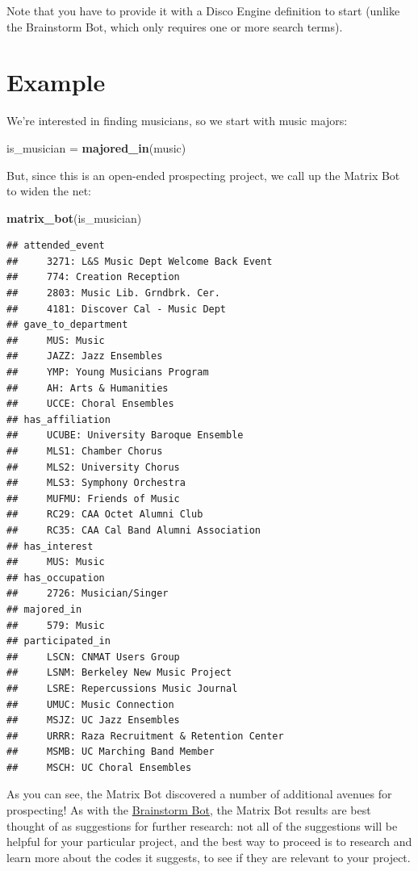 \documentclass[]{book}
\newenvironment{Shaded}{\begin{snugshade}}{\end{snugshade}}
\newcommand{\KeywordTok}[1]{\textcolor[rgb]{0.13,0.29,0.53}{\textbf{#1}}}
\newcommand{\NormalTok}[1]{#1}
\newcommand{\StringTok}[1]{\textcolor[rgb]{0.31,0.60,0.02}{#1}}
\begin{document}
Note that you have to provide it with a Disco Engine definition to start (unlike the Brainstorm Bot, which only requires one or more search terms).

\hypertarget{example-1}{%
\section{Example}\label{example-1}}

We're interested in finding musicians, so we start with music majors:

\begin{Shaded}
\begin{Highlighting}[]
\NormalTok{is_musician =}\StringTok{ }\KeywordTok{majored_in}\NormalTok{(music)}
\end{Highlighting}
\end{Shaded}

But, since this is an open-ended prospecting project, we call up the Matrix Bot to widen the net:

\begin{Shaded}
\begin{Highlighting}[]
\KeywordTok{matrix_bot}\NormalTok{(is_musician)}
\end{Highlighting}
\end{Shaded}

\begin{verbatim}
## attended_event 
##     3271: L&S Music Dept Welcome Back Event
##     774: Creation Reception
##     2803: Music Lib. Grndbrk. Cer.
##     4181: Discover Cal - Music Dept
## gave_to_department 
##     MUS: Music
##     JAZZ: Jazz Ensembles
##     YMP: Young Musicians Program
##     AH: Arts & Humanities
##     UCCE: Choral Ensembles
## has_affiliation 
##     UCUBE: University Baroque Ensemble
##     MLS1: Chamber Chorus
##     MLS2: University Chorus
##     MLS3: Symphony Orchestra
##     MUFMU: Friends of Music
##     RC29: CAA Octet Alumni Club
##     RC35: CAA Cal Band Alumni Association
## has_interest 
##     MUS: Music
## has_occupation 
##     2726: Musician/Singer
## majored_in 
##     579: Music
## participated_in 
##     LSCN: CNMAT Users Group
##     LSNM: Berkeley New Music Project
##     LSRE: Repercussions Music Journal
##     UMUC: Music Connection
##     MSJZ: UC Jazz Ensembles
##     URRR: Raza Recruitment & Retention Center
##     MSMB: UC Marching Band Member
##     MSCH: UC Choral Ensembles
\end{verbatim}

As you can see, the Matrix Bot discovered a number of additional avenues for prospecting! As with the \protect\hyperlink{brainstorm-bot}{Brainstorm Bot}, the Matrix Bot results are best thought of as suggestions for further research: not all of the suggestions will be helpful for your particular project, and the best way to proceed is to research and learn more about the codes it suggests, to see if they are relevant to your project.
\end{document}
